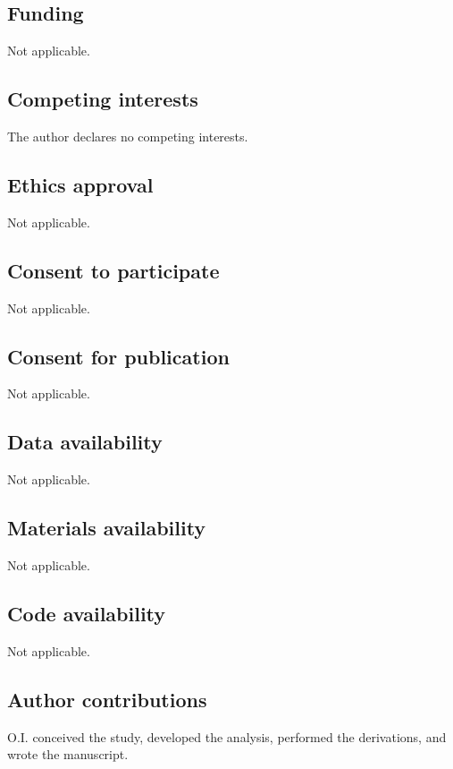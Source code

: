 \documentclass[pdflatex,sn-mathphys-num]{sn-jnl}
\begin{document}
        \subsection*{Funding}
            Not applicable.

        \subsection*{Competing interests}
            The author declares no competing interests.

        \subsection*{Ethics approval}
            Not applicable.

        \subsection*{Consent to participate}
            Not applicable.

        \subsection*{Consent for publication}
            Not applicable.

        \subsection*{Data availability}
            Not applicable.

        \subsection*{Materials availability}
            Not applicable.

        \subsection*{Code availability}
            Not applicable.

        \subsection*{Author contributions}
            O.I. conceived the study, developed the analysis, performed the derivations, and wrote the manuscript.
\end{document}
